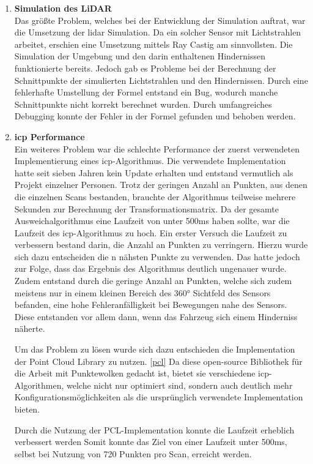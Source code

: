 \begin{enumerate}[leftmargin=*]
    \item \textbf{Simulation des LiDAR} \\
    Das größte Problem, welches bei der Entwicklung der Simulation auftrat, war die Umsetzung der \ac{lidar} Simulation.
    Da ein solcher Sensor mit Lichtstrahlen arbeitet, erschien eine Umsetzung mittels Ray Castig am sinnvollsten.
    Die Simulation der Umgebung und den darin enthaltenen Hindernissen funktionierte bereits.
    Jedoch gab es Probleme bei der Berechnung der Schnittpunkte der simulierten Lichtstrahlen und den Hindernissen.
    Durch eine fehlerhafte Umstellung der Formel entstand ein Bug, wodurch manche Schnittpunkte nicht korrekt berechnet wurden.
    Durch umfangreiches Debugging konnte der Fehler in der Formel gefunden und behoben werden.

    \item \textbf{\ac{icp} Performance} \\
    Ein weiteres Problem war die schlechte Performance der zuerst verwendeten Implementierung eines \acf{icp}-Algorithmus.
    Die verwendete Implementation hatte seit sieben Jahren kein Update erhalten und entstand vermutlich als Projekt einzelner Personen.
    Trotz der geringen Anzahl an Punkten, aus denen die einzelnen Scans bestanden, brauchte der Algorithmus teilweise mehrere Sekunden zur Berechnung der Transformationsmatrix.
    Da der gesamte Ausweichalgorithmus eine Laufzeit von unter 500ms haben sollte, war die Laufzeit des \ac{icp}-Algorithmus zu hoch.
    Ein erster Versuch die Laufzeit zu verbessern bestand darin, die Anzahl an Punkten zu verringern.
    Hierzu wurde sich dazu entscheiden die n nähsten Punkte zu verwenden.
    Das hatte jedoch zur Folge, dass das Ergebnis des Algorithmus deutlich ungenauer wurde.
    Zudem entstand durch die geringe Anzahl an Punkten, welche sich zudem meistens nur in einem kleinen Bereich des 360° Sichtfeld des Sensors befanden, 
    eine hohe Fehleranfälligkeit bei Bewegungen nahe des Sensors.
    Diese entstanden vor allem dann, wenn das Fahrzeug sich einem Hinderniss näherte.

    Um das Problem zu lösen wurde sich dazu entschieden die Implementation der Point Cloud Library zu nutzen. \ref{pcl}
    Da diese open-source Bibliothek für die Arbeit mit Punktewolken gedacht ist, bietet sie verschiedene \ac{icp}-Algorithmen,
    welche nicht nur optimiert sind, sondern auch deutlich mehr Konfigurationsmöglichkeiten als die ursprünglich verwendete Implementation bieten.
    
    Durch die Nutzung der PCL-Implementation konnte die Laufzeit erheblich verbessert werden
    Somit konnte das Ziel von einer Laufzeit unter 500ms, selbst bei Nutzung von 720 Punkten pro Scan, erreicht werden.


\end{enumerate}
